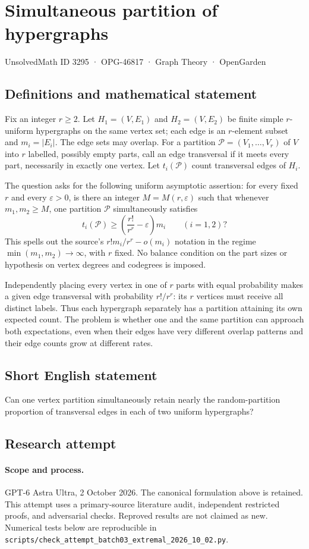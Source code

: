 \documentclass[11pt,a4paper]{article}
\begin{document}
\section*{Simultaneous partition of hypergraphs}\label{3295}
{\small UnsolvedMath ID 3295 · OPG-46817 · Graph Theory · OpenGarden}
\subsection{Definitions and mathematical statement}
Fix an integer $r\ge2$. Let $H_1=(V,E_1)$ and $H_2=(V,E_2)$ be finite
simple $r$-uniform hypergraphs on the same vertex set; each edge is an
$r$-element subset and $m_i=|E_i|$. The edge sets may overlap. For a
partition $\mathcal P=(V_1,\ldots,V_r)$ of $V$ into $r$ labelled,
possibly empty parts, call an edge transversal if it meets every
part, necessarily in exactly one vertex. Let $t_i(\mathcal P)$ count
transversal edges of $H_i$.

The question asks for the following uniform asymptotic assertion:
for every fixed $r$ and every $\varepsilon>0$, is there an integer
$M=M(r,\varepsilon)$ such that whenever $m_1,m_2\ge M$, one partition
$\mathcal P$ simultaneously satisfies
\[
             t_i(\mathcal P)\ge
             \left(\frac{r!}{r^r}-\varepsilon\right)m_i
                         \qquad(i=1,2)?
\]
This spells out the source's $r!m_i/r^r-o(m_i)$ notation in the regime
$\min(m_1,m_2)\to\infty$, with $r$ fixed. No balance condition on the
part sizes or hypothesis on vertex degrees and codegrees is imposed.

Independently placing every vertex in one of $r$ parts with equal
probability makes a given edge transversal with probability $r!/r^r$:
its $r$ vertices must receive all distinct labels. Thus each hypergraph
separately has a partition attaining its own expected count. The
problem is whether one and the same partition can approach both
expectations, even when their edges have very different overlap
patterns and their edge counts grow at different rates.
\subsection{Short English statement}
Can one vertex partition simultaneously retain nearly the random-partition proportion of transversal edges in each of two uniform hypergraphs?
\subsection{Research attempt}
\paragraph{Scope and process.}
GPT-6 Astra Ultra, 2 October 2026. The canonical formulation above is retained. This attempt uses a primary-source literature audit, independent restricted proofs, and adversarial checks. Reproved results are not claimed as new. Numerical tests below are reproducible in \texttt{scripts/check\_attempt\_batch03\_extremal\_2026\_10\_02.py}.
\end{document}
